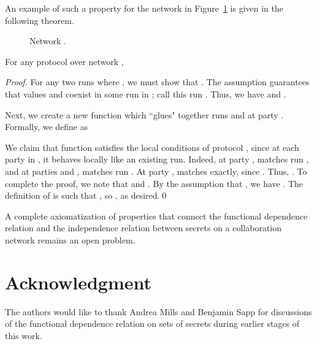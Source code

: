 \documentclass{llncs}
\begin{document}
An example of such a property for the network  in Figure~\ref{linear_graph} is given in the following theorem.
\begin{figure}[htbp]
   \centering
   \caption{Network .}
   \label{linear_graph}
\end{figure}
\begin{theorem}\label{concl thm}
For any protocol  over network , 

\end{theorem}
\begin{proof}
For any two runs  where , we must show that .  The assumption  guarantees that values  and  coexist in some run in ; call this run .  Thus, we have  and .  

Next, we create a new function  which ``glues" together runs  and  at party .  Formally, we define  as 



We claim that function  satisfies the local conditions of protocol , since at each party in , it behaves locally like an existing run.  Indeed, at party ,  matches run , and at parties  and ,  matches run .  At party ,  matches  exactly, since .  Thus, .  To complete the proof, we note that  and .  By the assumption that , we have .  The definition of  is such that , so , as desired.\qed 
\end{proof}

A complete axiomatization of properties that connect the functional dependence relation and the independence relation between secrets on a collaboration network remains an open problem. 

\section{Acknowledgment}

The authors would like to thank Andrea Mills and Benjamin Sapp for discussions of the functional dependence relation on sets of secrets during earlier stages of this work.


\end{document}
